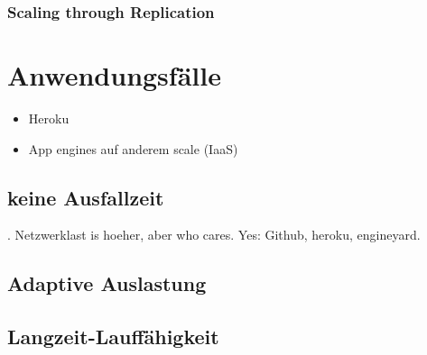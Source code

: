 \documentclass[draft,journal]{IEEEtran}
\begin{document}
\subsubsection{Scaling through Replication}


\section{Anwendungsfälle}
\label{sec:anwendungsbeispiele}

\begin{itemize}
\item Heroku
\item App engines auf anderem scale (IaaS)
\end{itemize}


\subsection{keine Ausfallzeit}
\label{sec:keine-ausfallzeit}

. Netzwerklast is hoeher, aber who cares.
Yes: Github, heroku, engineyard.


\subsection{Adaptive Auslastung}
\label{sec:adaptive-auslastung}

\subsection{Langzeit-Lauffähigkeit}
\label{sec:langz-lauff}





\end{document}
